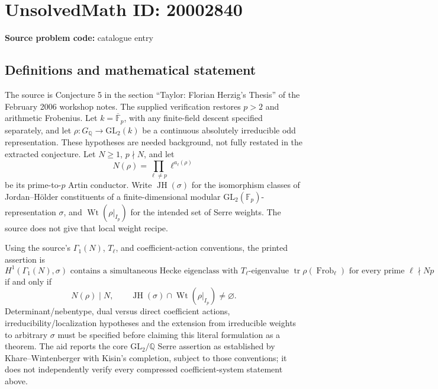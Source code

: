 \documentclass[11pt]{article}
\newcommand{\Q}{\mathbb{Q}}
\newcommand{\F}{\mathbb{F}}
\begin{document}
\section*{UnsolvedMath ID: 20002840}
\textbf{Source problem code:} catalogue entry
\subsection{Definitions and mathematical statement}
The source is Conjecture 5 in the section ``Taylor: Florian Herzig's Thesis'' of the February 2006 workshop notes. The supplied verification restores \(p>2\) and arithmetic Frobenius. Let \(k=\overline{\F}_p\), with any finite-field descent specified separately, and let \(\rho:G_\Q\to\mathrm{GL}_2(k)\) be a continuous absolutely irreducible odd representation. These hypotheses are needed background, not fully restated in the extracted conjecture. Let \(N\ge1\), \(p\nmid N\), and let
\[
 N(\rho)=\prod_{\ell\ne p}\ell^{a_\ell(\rho)}
\]
be its prime-to-\(p\) Artin conductor. Write \(\operatorname{JH}(\sigma)\) for the isomorphism classes of Jordan--H\"older constituents of a finite-dimensional modular \(\mathrm{GL}_2(\F_p)\)-representation \(\sigma\), and \(\operatorname{Wt}(\rho|_{I_p})\) for the intended set of Serre weights. The source does not give that local weight recipe.

Using the source's \(\Gamma_1(N)\), \(T_\ell\), and coefficient-action conventions, the printed assertion is
\[
 H^1(\Gamma_1(N),\sigma)\text{ contains a simultaneous Hecke eigenclass with }
 T_\ell\text{-eigenvalue }\operatorname{tr}\rho(\operatorname{Frob}_\ell)
 \text{ for every prime }\ell\nmid Np
\]
if and only if
\[
 N(\rho)\mid N,\qquad
 \operatorname{JH}(\sigma)\cap\operatorname{Wt}(\rho|_{I_p})\ne\varnothing.
\]
Determinant/nebentype, dual versus direct coefficient actions, irreducibility/localization hypotheses and the extension from irreducible weights to arbitrary \(\sigma\) must be specified before claiming this literal formulation as a theorem. The aid reports the core \(\mathrm{GL}_2/\Q\) Serre assertion as established by Khare--Wintenberger with Kisin's completion, subject to those conventions; it does not independently verify every compressed coefficient-system statement above.
\end{document}
